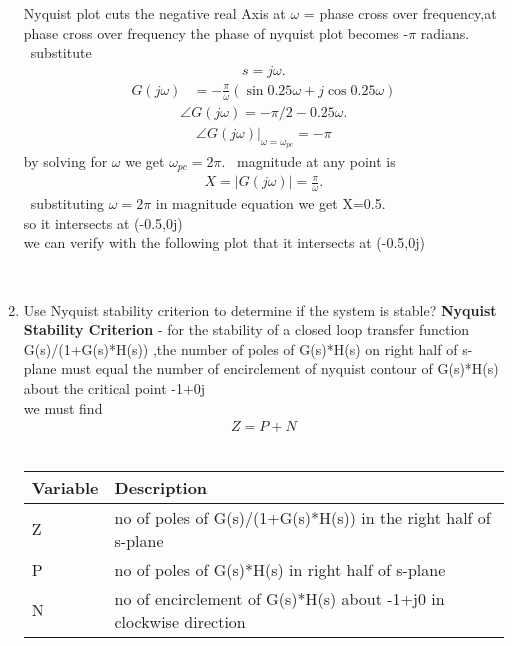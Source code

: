 \begin{enumerate}[label=\thesection.\arabic*.,ref=\thesection.\theenumi]
 Nyquist plot cuts the negative real
Axis at $\omega$ = phase cross over frequency,at phase cross over frequency the phase of nyquist plot becomes -$\pi$ radians.
\
\newline substitute \begin{align}
s=j\omega.\end{align} 
\begin{align}
G(j\omega)&= -\frac{\pi}{\omega}(\sin{0.25\omega}+j\cos{0.25\omega})
\end{align}
\begin{align}
\angle G(j\omega)=-\pi/2 -0.25\omega.
\end{align}
\begin{align}
\angle G(j\omega)|_{\omega=\omega_{pc}}=-\pi
\end{align}
by solving for $\omega$ we get $\omega_{pc}=2\pi$.
\
\newline magnitude at any point is\begin{align}
X=|G(j\omega)|=\frac{\pi}{\omega}.    
\end{align} 
\
\newline substituting $\omega=2\pi$ in magnitude equation we get X=0.5.
\\
\newline so it intersects at (-0.5,0j)
\\
\newline we can verify with the following plot that it intersects at (-0.5,0j)

\\
\item Use Nyquist stability criterion to determine if the system is stable?
\newline
\solution
 \textbf{Nyquist Stability Criterion} - for  the stability of a closed loop transfer function G(s)/(1+G(s)*H(s)) ,the number of poles of G(s)*H(s) on right half of s-plane must equal the number of encirclement of nyquist contour of  G(s)*H(s) about the critical point -1+0j
\\
\newline we must find
\begin{align}
Z=P+N    
\end{align}
\
\begin{tabular}{ |p{4cm}||p{4cm}|  }
 \hline
 
 \hline
 Variable&Description\\
 \hline
 Z&no of poles of G(s)/(1+G(s)*H(s)) in the right half of s-plane\\
 \hline
 P&no of poles of G(s)*H(s) in right half of s-plane \\
 \hline
 N&no of encirclement of G(s)*H(s) about -1+j0 in clockwise direction\\
 

\end{tabular}
\end{enumerate}
